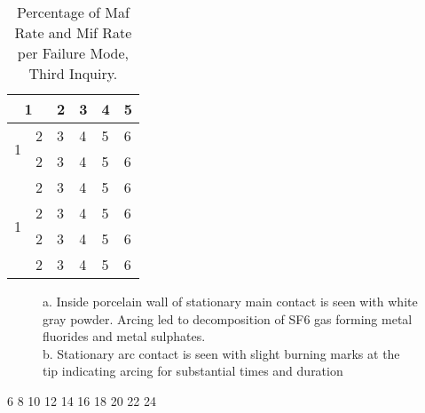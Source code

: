 \begin{table}[!htbp]
\begin{threeparttable}
\renewcommand{\arraystretch}{1.3}
\caption{Percentage of Maf Rate and Mif Rate per Failure Mode, Third Inquiry.}
\label{table:Percentage of Maf Rate}
\centering
\small

\begin{tabular}{| l | c | l | l | l | l |} \hline
\multicolumn{2}{|c|}{1} & 2 & 3 & 4 & 5 \\ \hline
\multirow{2}{*}{1}		& 2 & 3 & 4 & 5 & 6 \\ \cline{2-6}
				 		& 2 & 3 & 4 & 5 & 6 \\ \hline
				 		
\multirow{4}{*}{1}		& 2 & 3 & 4 & 5 & 6 \\ \cline{2-6}
						& 2 & 3 & 4 & 5 & 6 \\ \cline{2-6}
						& 2 & 3 & 4 & 5 & 6 \\ \cline{2-6}
				 		& 2 & 3 & 4 & 5 & 6 \\ \hline
\end{tabular}
\end{threeparttable}
\end{table}

    \begin{subfigure}[b]{0.3\textwidth}
        \centering
        \begin{minipage}{\textwidth}
		\centering
		\begin{flushleft}
		\footnotesize a. Inside porcelain wall of stationary main contact is seen with white gray powder. Arcing led to decomposition of SF6 gas forming metal fluorides and metal sulphates.\\
b. Stationary arc contact is seen with slight burning marks at the tip indicating arcing for substantial times and duration
		\end{flushleft}
		\end{minipage}
    \end{subfigure}

6  \tiny
8  \scriptsize
10 \footnotesize
12 \small
14 \normalsize
16 \large
18 \Large
20 \LARGE
22 \huge
24 \Huge



